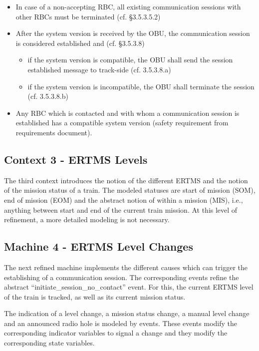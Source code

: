 \documentclass{template/openetcs_article}
\begin{document}
\begin{itemize}
\item In case of a non-accepting RBC, all existing communication sessions with
  other RBCs must be terminated (cf. §3.5.3.5.2)
\item After the system version  is received by the OBU, the communication
  session is considered established and (cf. §3.5.3.8)
  \begin{itemize}
  \item if the system version is compatible, the OBU shall send the session
    established message to track-side (cf. 3.5.3.8.a)
  \item if the system version is incompatible, the OBU shall terminate the
    session (cf. 3.5.3.8.b)
  \end{itemize}
\item Any RBC which is contacted and with whom a communication session is
  established has a compatible system version (safety requirement from
  requirements document).
\end{itemize}



\subsection{Context 3 - ERTMS Levels}
\label{sec:context-3-ertms}

The third context introduces the notion of the different ERTMS and the notion of
the mission status of a train. The modeled statuses are start of mission (SOM),
end of mission (EOM) and the abstract notion of within a mission (MIS), i.e.,
anything between start and end of the current train mission. At this level of
refinement, a more detailed modeling is not necessary.




\subsection{Machine 4 - ERTMS Level Changes}
\label{sec:machine-4-ertms}

The next refined machine implements the different causes which can trigger the
establishing of a communication session. The corresponding events refine the
abstract ``initiate\_session\_no\_contact'' event. For this, the current ERTMS
level of the train is tracked, as well as its current mission status.

The indication of a level change, a mission status change, a manual level change
and an announced radio hole is modeled by events. These events modify the
corresponding indicator variables to signal a change and they modify the
corresponding state variables.
\end{document}
